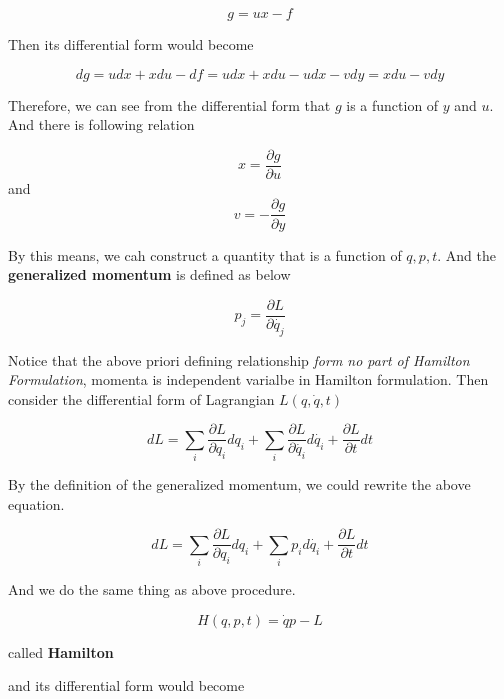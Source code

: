 \documentclass[12pt]{article}
\numberwithin{equation}{section}
\begin{document}
\begin{center}
    \[ g = ux - f \]    
\end{center}

Then its differential form would become

\begin{center}
    \[dg = udx + xdu - df = udx + xdu - udx - vdy = xdu - vdy\]    
\end{center}

Therefore, we can see from the differential form that $g$ is a function of $y$ and $u$. And there is following relation

\begin{center}
    \[ x = \frac{\partial{g}}{\partial{u}} \] and \[ v = -\frac{\partial{g}}{\partial{y}}\]  
\end{center}

By this means, we cah construct a quantity that is a function of $q, p, t$. And the \textbf{generalized momentum} is defined as below

\begin{center}
    \[ p_j = \frac{\partial{L}}{\partial{\dot{q_j}}} \]
\end{center}

Notice that the above priori defining relationship \textit{form no part of Hamilton Formulation}, momenta is independent varialbe in Hamilton formulation.
Then consider the differential form of Lagrangian $L(q, \dot{q}, t)$

\begin{center}
    \[ dL = \sum_{i}\frac{\partial{L}}{\partial{q_i}} dq_i + \sum_{i}\frac{ \partial{L} }{ \partial{\dot{q_i}} } d\dot{q_i} + \frac{\partial{L}}{\partial{t}} dt\]
\end{center}

By the definition of the generalized momentum, we could rewrite the above equation.

\begin{center}
    \[ dL = \sum_{i} \frac{ \partial{L} }{ \partial{q_i} }dq_i + \sum_{i} p_i d\dot{q_i} + \frac{ \partial{L} }{ \partial{t} }dt\]    
\end{center}

And we do the same thing as above procedure.

\begin{center}
    \[ H(q, p, t) = \dot{q}p - L\]
\end{center}

called \textbf{Hamilton}

and its differential form would become 
\end{document}
